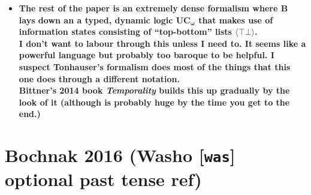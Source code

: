 \documentclass[10pt]{article}
\begin{document}
\begin{itemize}
\begin{itemize}
\begin{itemize}
	\end{itemize}
\end{itemize}
	\item \textbf{The rest of the paper is an extremely dense formalism where B lays down an a typed, dynamic logic $\boldsymbol{UC_\omega}$ that makes use of information states consisting of ``top-bottom'' lists $\langle\top\bot\rangle$.\\
	I don't want to labour through this unless I need to. It seems like a powerful language but probably too baroque to be helpful. I suspect Tonhauser's formalism does most of the things that this one does through a different notation.\\Bittner's 2014 book \textit{Temporality} builds this up gradually by the look of it (although is probably huge by the time you get to the end.)
}


\end{itemize}


\section{Bochnak 2016 (Washo [\texttt{was}] optional past tense ref)}
\end{document}
